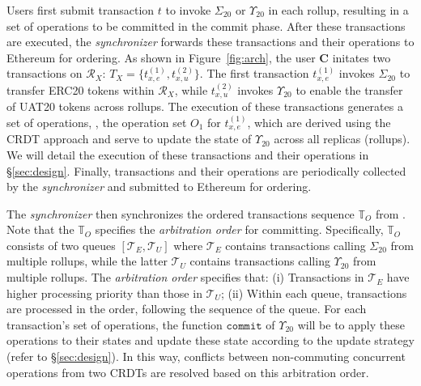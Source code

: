  Users first submit transaction $t$ to invoke $\Sigma_{20}$ or $\Upsilon_{20}$ in each rollup, resulting in a set of operations to be committed in the commit phase. After these transactions are executed,  the \emph{synchronizer} forwards these transactions and their operations to Ethereum for ordering. As shown in Figure~\ref{fig:arch}, the user $\textbf{C}$ initates two transactions on $\mathcal{R}_X$: $T_X = \{t^{(1)}_{x, e}, t^{(2)}_{x,u}\}$.
 The first transaction $t^{(1)}_{x, e}$ invokes $\Sigma_{20}$ to transfer ERC20 tokens within $\mathcal{R}_X$, while $t^{(2)}_{x,u}$ invokes $\Upsilon_{20}$ to enable the transfer of UAT20 tokens across rollups. 
 The execution of these transactions generates a set of operations, \eg, the operation set $O_1$ for $t^{(1)}_{x, e}$, which are derived using the CRDT approach and serve to update the state of $\Upsilon_{20}$ across all replicas (rollups). We will detail the execution of these transactions and their operations in \S\ref{sec:design}.
Finally, transactions and their operations are periodically collected by the \emph{synchronizer} and submitted to Ethereum for ordering.
 



The \emph{synchronizer} then synchronizes the ordered transactions sequence $\mathbb{T}_{O}$ from \ethereum. Note that the $\mathbb{T}_{O}$ specifies the \emph{arbitration order} for committing.
Specifically, $\mathbb{T}_{O}$ consists of two queues $[\mathcal{T}_E, \mathcal{T}_U]$ where $\mathcal{T}_E$ contains transactions calling $\Sigma_{20}$ from multiple rollups, while the latter $\mathcal{T}_U$ contains transactions calling $\Upsilon_{20}$ from multiple rollups.
The \emph{arbitration order} specifies that: (i) Transactions in $\mathcal{T}_E$ have higher processing priority than those in $\mathcal{T}_U$; 
(ii) Within each queue, transactions are processed in the order, following the sequence of the queue.
For each transaction's set of operations, the function $\mathtt{commit}$ of $\Upsilon_{20}$ will be to apply these operations to their states and update these state according to the update strategy (refer to \S\ref{sec:design}).
In this way, conflicts between non-commuting concurrent operations from two CRDTs are resolved based on this arbitration order.

